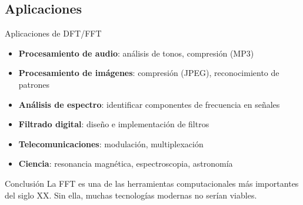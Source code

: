 \documentclass[aspectratio=169]{beamer}
\begin{document}
\subsection{Aplicaciones}
\begin{frame}{Aplicaciones de DFT/FFT}
\begin{itemize}
    \item \textbf{Procesamiento de audio}: análisis de tonos, compresión (MP3)
    \item \textbf{Procesamiento de imágenes}: compresión (JPEG), reconocimiento de patrones
    \item \textbf{Análisis de espectro}: identificar componentes de frecuencia en señales
    \item \textbf{Filtrado digital}: diseño e implementación de filtros
    \item \textbf{Telecomunicaciones}: modulación, multiplexación
    \item \textbf{Ciencia}: resonancia magnética, espectroscopia, astronomía
\end{itemize}

\vspace{0.5cm}
\begin{alertblock}{Conclusión}
La FFT es una de las herramientas computacionales más importantes del siglo XX. Sin ella, muchas tecnologías modernas no serían viables.
\end{alertblock}
\end{frame}
\end{document}

